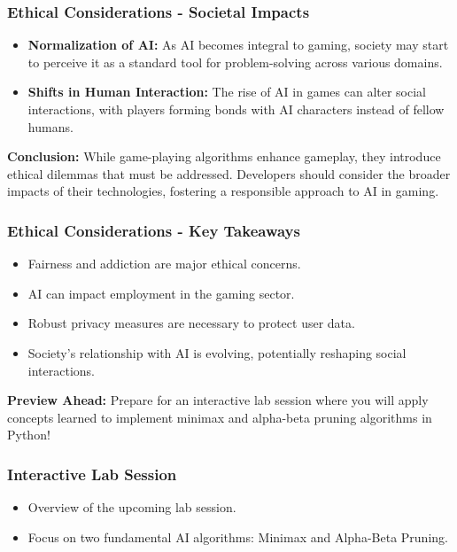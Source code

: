 \documentclass[aspectratio=169]{beamer}
\begin{document}
\begin{frame}[fragile]
    \frametitle{Ethical Considerations - Societal Impacts}
    \begin{itemize}
        \item \textbf{Normalization of AI:} As AI becomes integral to gaming, society may start to perceive it as a standard tool for problem-solving across various domains.
        
        \item \textbf{Shifts in Human Interaction:} The rise of AI in games can alter social interactions, with players forming bonds with AI characters instead of fellow humans.
    \end{itemize}
    
    \textbf{Conclusion:} While game-playing algorithms enhance gameplay, they introduce ethical dilemmas that must be addressed. Developers should consider the broader impacts of their technologies, fostering a responsible approach to AI in gaming.
\end{frame}

\begin{frame}[fragile]
    \frametitle{Ethical Considerations - Key Takeaways}
    \begin{itemize}
        \item Fairness and addiction are major ethical concerns.
        \item AI can impact employment in the gaming sector.
        \item Robust privacy measures are necessary to protect user data.
        \item Society's relationship with AI is evolving, potentially reshaping social interactions.
    \end{itemize}
    
    \textbf{Preview Ahead:} Prepare for an interactive lab session where you will apply concepts learned to implement minimax and alpha-beta pruning algorithms in Python!
\end{frame}

\begin{frame}
    \frametitle{Interactive Lab Session}
    \begin{itemize}
        \item Overview of the upcoming lab session.
        \item Focus on two fundamental AI algorithms: Minimax and Alpha-Beta Pruning.
    \end{itemize}
\end{frame}
\end{document}
